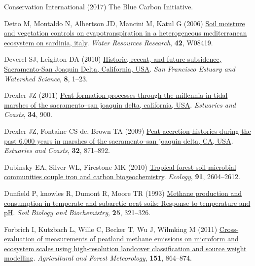 \documentclass[
  12pt,
]{article}
\newlength{\cslhangindent}
\newenvironment{CSLReferences}[2] %
 {\begin{list}{}{%
  \setlength{\itemindent}{0pt}
  \setlength{\leftmargin}{0pt}
  \setlength{\parsep}{0pt}
  \ifodd #1
   \setlength{\leftmargin}{\cslhangindent}
   \setlength{\itemindent}{-1\cslhangindent}
  \fi
  \setlength{\itemsep}{#2\baselineskip}}}
 {\end{list}}
\begin{document}
\begin{CSLReferences}{1}{0}
Conservation International (2017) The {Blue} {Carbon} {Initiative}.

Detto M, Montaldo N, Albertson JD, Mancini M, Katul G (2006)
\href{https://doi.org/10.1029/2005WR004693}{Soil moisture and vegetation
controls on evapotranspiration in a heterogeneous mediterranean
ecosystem on sardinia, italy}. \emph{Water Resources Research},
\textbf{42}, W08419.

Deverel SJ, Leighton DA (2010)
\href{http://escholarship.org/uc/item/7xd4x0xw}{Historic, recent, and
future subsidence, {Sacramento-San Joaquin Delta, California, USA}}.
\emph{San Francisco Estuary and Watershed Science}, \textbf{8}, 1--23.

Drexler JZ (2011) \href{https://doi.org/10.1007/s12237-011-9393-7}{Peat
formation processes through the millennia in tidal marshes of the
sacramento--san joaquin delta, california, {USA}}. \emph{Estuaries and
Coasts}, \textbf{34}, 900.

Drexler JZ, Fontaine CS de, Brown TA (2009)
\href{https://doi.org/10.1007/s12237-009-9202-8}{Peat accretion
histories during the past 6,000 years in marshes of the sacramento--san
joaquin delta, {CA}, {USA}}. \emph{Estuaries and Coasts}, \textbf{32},
871--892.

Dubinsky EA, Silver WL, Firestone MK (2010)
\href{https://doi.org/10.1890/09-1365.1}{Tropical forest soil microbial
communities couple iron and carbon biogeochemistry}. \emph{Ecology},
\textbf{91}, 2604--2612.

Dunfield P, knowles R, Dumont R, Moore TR (1993)
\href{https://doi.org/10.1016/0038-0717(93)90130-4}{Methane production
and consumption in temperate and subarctic peat soils: Response to
temperature and {pH}}. \emph{Soil Biology and Biochemistry},
\textbf{25}, 321--326.

Forbrich I, Kutzbach L, Wille C, Becker T, Wu J, Wilmking M (2011)
\href{https://doi.org/10.1016/j.agrformet.2011.02.006}{Cross-evaluation
of measurements of peatland methane emissions on microform and ecosystem
scales using high-resolution landcover classification and source weight
modelling}. \emph{Agricultural and Forest Meteorology}, \textbf{151},
864--874.


\end{CSLReferences}
\end{document}
